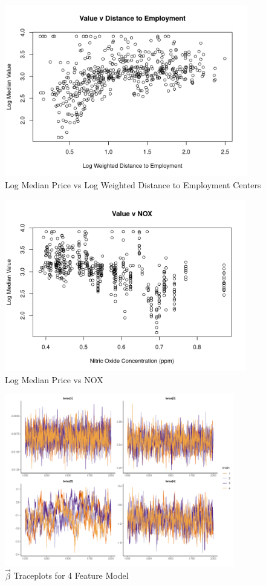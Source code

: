 \documentclass[11pt]{article}
\begin{document}
\begin{figure}[h!] 
  \centering
  \includegraphics[height=75mm]{employment.png}
  \caption{Log Median Price vs Log Weighted Distance to Employment Centers}
  \label{fig:employment}
\end{figure}

\begin{figure}[h!] 
	\centering
  \includegraphics[height=75mm]{nox.png}
  \caption{Log Median Price vs NOX}
  \label{fig:nox}
\end{figure}


\begin{figure}[h!] 
	\centering
  \includegraphics[height=75mm]{traceplot_betas.png}
  \caption{$\vec{\beta}$ Traceplots for 4 Feature Model}
  \label{fig:tbetas}
\end{figure}
\end{document}
